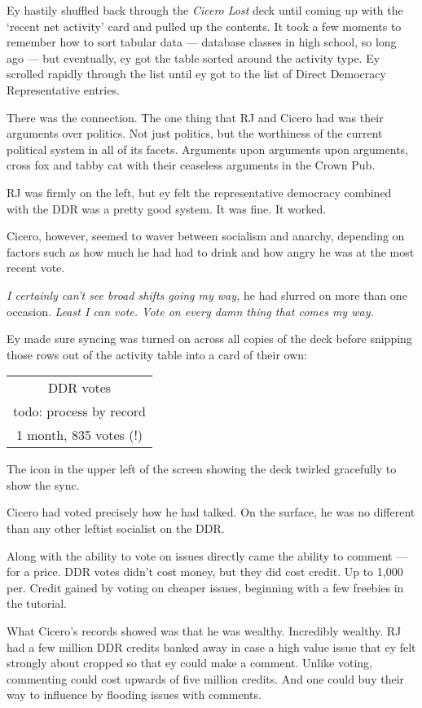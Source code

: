 Ey hastily shuffled back through the \emph{Cicero Lost} deck until coming up with the `recent net activity' card and pulled up the contents. It took a few moments to remember how to sort tabular data --- database classes in high school, so long ago --- but eventually, ey got the table sorted around the activity type. Ey scrolled rapidly through the list until ey got to the list of Direct Democracy Representative entries.

There was the connection. The one thing that RJ and Cicero had was their arguments over politics. Not just politics, but the worthiness of the current political system in all of its facets. Arguments upon arguments upon arguments, cross fox and tabby cat with their ceaseless arguments in the Crown Pub.

RJ was firmly on the left, but ey felt the representative democracy combined with the DDR was a pretty good system. It was fine. It worked.

Cicero, however, seemed to waver between socialism and anarchy, depending on factors such as how much he had had to drink and how angry he was at the most recent vote.

\emph{I certainly can't see broad shifts going my way,} he had slurred on more than one occasion. \emph{Least I can vote. Vote on every damn thing that comes my way.}

Ey made sure syncing was turned on across all copies of the deck before snipping those rows out of the activity table into a card of their own:

\begin{longtable}[]{@{}c@{}}
\toprule
\endhead
DDR votes\tabularnewline
todo: process by record\tabularnewline
1 month, 835 votes (!)\tabularnewline
\bottomrule
\end{longtable}

The icon in the upper left of the screen showing the deck twirled gracefully to show the sync.

Cicero had voted precisely how he had talked. On the surface, he was no different than any other leftist socialist on the DDR.

Along with the ability to vote on issues directly came the ability to comment --- for a price. DDR votes didn't cost money, but they did cost credit. Up to 1,000 per. Credit gained by voting on cheaper issues, beginning with a few freebies in the tutorial.

What Cicero's records showed was that he was wealthy. Incredibly wealthy. RJ had a few million DDR credits banked away in case a high value issue that ey felt strongly about cropped so that ey could make a comment. Unlike voting, commenting could cost upwards of five million credits. And one could buy their way to influence by flooding issues with comments.

